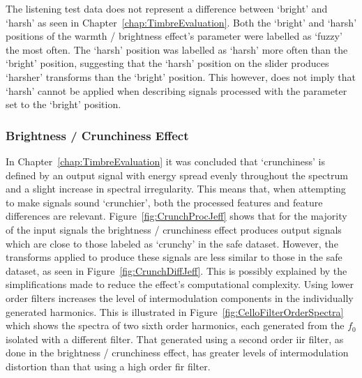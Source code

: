 			The listening test data does not represent a difference between `bright' and `harsh' as seen in
			Chapter~\ref{chap:TimbreEvaluation}. Both the `bright' and `harsh' positions of the warmth /
			brightness effect's parameter were labelled as `fuzzy' the most often. The `harsh' position was
			labelled as `harsh' more often than the `bright' position, suggesting that the `harsh' position on
			the slider produces `harsher' transforms than the `bright' position. This however, does not imply
			that `harsh' cannot be applied when describing signals processed with the parameter set to the
			`bright' position.
			
		\subsubsection*{Brightness / Crunchiness Effect}
			In Chapter~\ref{chap:TimbreEvaluation} it was concluded that `crunchiness' is defined by an output
			signal with energy spread evenly throughout the spectrum and a slight increase in spectral
			irregularity. This means that, when attempting to make signals sound `crunchier', both the
			processed features and feature differences are relevant.  Figure~\ref{fig:CrunchProcJeff} shows
			that for the majority of the input signals the brightness / crunchiness effect produces output
			signals which are close to those labeled as `crunchy' in the \acrshort{safe} dataset. However, the
			transforms applied to produce these signals are less similar to those in the \acrshort{safe}
			dataset, as seen in Figure~\ref{fig:CrunchDiffJeff}. This is possibly explained by the
			simplifications made to reduce the effect's computational complexity. Using lower order filters
			increases the level of intermodulation components in the individually generated harmonics. This is
			illustrated in Figure~\ref{fig:CelloFilterOrderSpectra} which shows the spectra of two sixth order
			harmonics, each generated from the $f_{0}$ isolated with a different filter. That generated using a
			second order \acrshort{iir} filter, as done in the brightness / crunchiness effect, has greater
			levels of intermodulation distortion than that using a high order \acrshort{fir} filter. 
			
